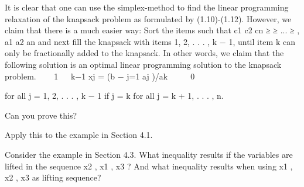 \begin{exercise}
It is clear that one can use the simplex-method to find the linear programming relaxation of the knapsack
problem as formulated by (1.10)-(1.12). However, we claim that there is a much easier way:
Sort the items such that
c1
c2
cn
≥
≥ ... ≥
,
a1
a2
an
and next fill the knapsack with items 1, 2, . . . , k − 1, until item k can only be fractionally added to the
knapsack. In other words, we claim that the following solution is an optimal linear programming solution
to the knapsack problem.



1


k−1
xj =
(b − j=1 aj )/ak



 0

for all j = 1, 2, . . . , k − 1
if j = k
for all j = k + 1, . . . , n.

Can you prove this?

Apply this to the example in Section 4.1.
\end{exercise}

\begin{exercise}
Consider the example in Section 4.3. What inequality results if the variables are lifted in the sequence
x2 , x1 , x3 ? And what inequality results when using x1 , x2 , x3 as lifting sequence?
\end{exercise}